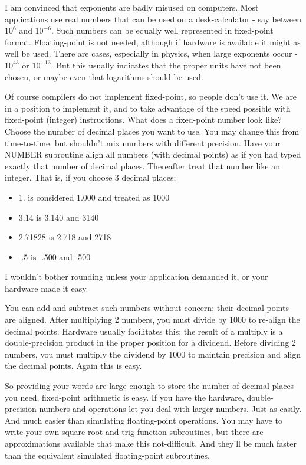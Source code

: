 \documentclass[b5paper, oneside]{book}
\begin{document}
I am convinced that exponents are badly misused on computers. Most applications use real numbers that can be used on a desk-calculator - say between $ 10^6 $ and $10^{-6}$. Such numbers can be equally well represented in fixed-point format. Floating-point is not needed, although if hardware is available it might as well be used. There are cases, especially in physics, when large exponents occur - $10^{43}$ or $10^{-13}$. But this usually indicates that the proper units have not been chosen, or maybe even that logarithms should be used.

Of course compilers do not implement fixed-point, so people don't use it. We are in a position to implement it, and to take advantage of the speed possible with fixed-point (integer) instructions. What does a fixed-point number look like? Choose the number of decimal places you want to use. You may change this from time-to-time, but shouldn't mix numbers with different precision. Have your NUMBER subroutine align all numbers (with decimal points) as if you had typed exactly that number of decimal places. Thereafter treat that number like an integer. That is, if you choose 3 decimal places:\begin{itemize}
   \item 1. is considered 1.000 and treated as 1000
   \item 3.14 is 3.140 and 3140
   \item 2.71828 is 2.718 and 2718
   \item -.5 is -.500 and -500\end{itemize}
I wouldn't bother rounding unless your application demanded it, or your hardware made it easy.

You can add and subtract such numbers without concern; their decimal points are aligned. After multiplying 2 numbers, you must divide by 1000 to re-align the decimal points. Hardware usually facilitates this; the result of a multiply is a double-precision product in the proper position for a dividend. Before dividing 2 numbers, you must multiply the dividend by 1000 to maintain precision and align the decimal points. Again this is easy.

So providing your words are large enough to store the number of decimal places you need, fixed-point arithmetic is easy. If you have the hardware, double-precision numbers and operations let you deal with larger numbers. Just as easily. And much easier than simulating floating-point operations. You may have to write your own square-root and trig-function subroutines, but there are approximations available that make this not-difficult. And they'll be much faster than the equivalent simulated floating-point subroutines.
\end{document}
